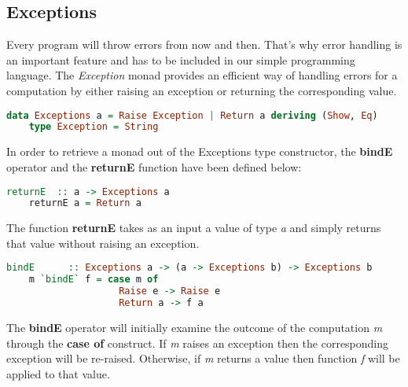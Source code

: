 \documentclass[a4paper, onecolumn]{article}
\begin{document}
    
    \subsection{Exceptions}
    
    Every program will throw errors from now and then. That's why error handling is an important feature and has to be included in our simple programming language. The \textit{Exception} monad provides an efficient way of handling errors for a computation by either raising an exception or returning the corresponding value.  
    
    \begin{tcolorbox}
    \begin{lstlisting}[language=Haskell] 
    data Exceptions a = Raise Exception | Return a deriving (Show, Eq)
    type Exception = String 
    \end{lstlisting}
    \end{tcolorbox}
    
    \noindent In order to retrieve a monad out of the Exceptions type constructor, the \textbf{bindE} operator and the \textbf{returnE} function have been defined below: 
    
    \begin{tcolorbox}
    \begin{lstlisting}[language=Haskell] 
    returnE  :: a -> Exceptions a 
    returnE a = Return a
    \end{lstlisting}
    \end{tcolorbox}
    
    \noindent The function \textbf{returnE} takes as an input a value of type \textit{a} and simply returns that value without raising an exception.
    
    \begin{tcolorbox}
    \begin{lstlisting}[language=Haskell] 
    bindE      :: Exceptions a -> (a -> Exceptions b) -> Exceptions b
    m `bindE` f = case m of 
                    Raise e -> Raise e 
                    Return a -> f a
    \end{lstlisting}
    \end{tcolorbox}
    
    \noindent The \textbf{bindE} operator will initially examine the outcome of the computation \textit{m} through the \textbf{case of} construct. If \textit{m} raises an exception then the corresponding exception will be re-raised. Otherwise, if \textit{m} returns a value then function \textit{f} will be applied to that value. 
    
\end{document}
